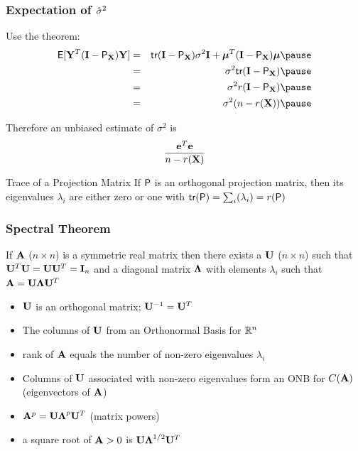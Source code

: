 \documentclass{beamer}
\begin{document}
\begin{frame}
  \frametitle{Expectation of $\shat$}
  
Use the theorem: \pause
\begin{eqnarray*}
\E[\Y^T (\I - \P_\X) \Y] & = &\tr (\I - \P_\X) \sigma^2 \I +
\mub^T(\I - \P_\X) \mub  \pause \\
 & = &  \sigma^2 \tr (\I - \P_\X) \pause \\
 & = & \sigma^2 r(\I - \P_\X) \pause\\
& = & \sigma^2 (n - r(\X)) \pause
\end{eqnarray*}


Therefore an unbiased estimate of $\sigma^2$ is $$\frac{\e^T\e}{n - r(\X)}$$
\pause

\begin{block}{Trace of a Projection Matrix}
If $\P$ is an orthogonal projection matrix, then its eigenvalues
$\lambda_i$ are
either zero or one with $\tr (\P) = \sum_i(\lambda_i) = r(\P)$
\end{block}

\end{frame}
\begin{frame}
  \frametitle{Spectral Theorem}
  \begin{theorem}
    If $\A$ ($n \times n$) is a symmetric real matrix  then there
    exists a  $\U$ ($n \times n$) such that $\U^T\U = \U \U^T = \I_n$
     and a diagonal matrix $\Lambdab$ with
    elements $\lambda_i$ such that $\A = \U \Lambdab \U^T$
  \end{theorem} \pause
  \begin{itemize}
  \item $\U$ is an orthogonal matrix; $\U^{-1} = \U^T$ \pause
  \item The columns of $\U$ from an Orthonormal Basis for $\bbR^n$ \pause
  \item rank of $\A$ equals the number of non-zero eigenvalues
    $\lambda_i$ \pause
  \item Columns of $\U$ associated with non-zero eigenvalues form an
    ONB for $C(\A)$ (eigenvectors of $\A$) \pause
\item $\A^p = \U \Lambdab^p \U^T$ (matrix powers) \pause
\item a square root of $\A > 0$ is $\U \Lambdab^{1/2}\U^T$ \pause
  \end{itemize}
\end{frame}
\end{document}
